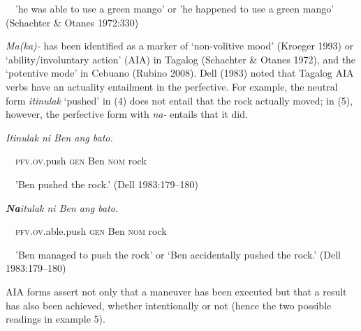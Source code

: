 \begin{stylelsIMT}
\ \ {}'he was able to use a green mango' or 'he happened to use a green mango' (Schachter \& Otanes 1972:330)
\end{stylelsIMT}

\begin{styleStandard}
\textit{Ma(ka)-} has been identified as a marker of ‘non-volitive mood’ (Kroeger 1993) or ‘ability/involuntary action’ (AIA) in Tagalog (Schachter \& Otanes 1972), and the ‘potentive mode’ in Cebuano (Rubino 2008). Dell (1983) noted that Tagalog AIA verbs have an actuality entailment in the perfective. For example, the neutral form \textit{itinulak} ‘pushed’ in (4) does not entail that the rock actually moved; in (5), however, the perfective form with \textit{na-} entails that it did.
\end{styleStandard}

\begin{listWWNumiileveli}
\item 
\begin{stylelsLanginfo}
\textit{Itinulak ni Ben ang bato.}
\end{stylelsLanginfo}
\end{listWWNumiileveli}
\begin{stylelsIMT}
\ \ \textsc{pfv.ov}.push \textsc{gen }Ben \textsc{nom }rock 
\end{stylelsIMT}

\begin{stylelsIMT}
\ \ {}'Ben pushed the rock.' (Dell 1983:179–180)
\end{stylelsIMT}

\begin{listWWNumiileveli}
\item 
\begin{stylelsLanginfo}
\textbf{\textit{Na}}\textit{itulak ni Ben ang bato.}
\end{stylelsLanginfo}
\end{listWWNumiileveli}
\begin{stylelsIMT}
\ \ \textsc{pfv.ov}.able.push \textsc{gen }Ben \textsc{nom }rock 
\end{stylelsIMT}

\begin{stylelsIMT}
\ \ {}'Ben managed to push the rock’ or ‘Ben accidentally pushed the rock.' (Dell 1983:179–180)
\end{stylelsIMT}

\begin{styleStandard}
AIA forms assert not only that a maneuver has been executed but that a result has also been achieved, whether intentionally or not (hence the two possible readings in example 5).
\end{styleStandard}

